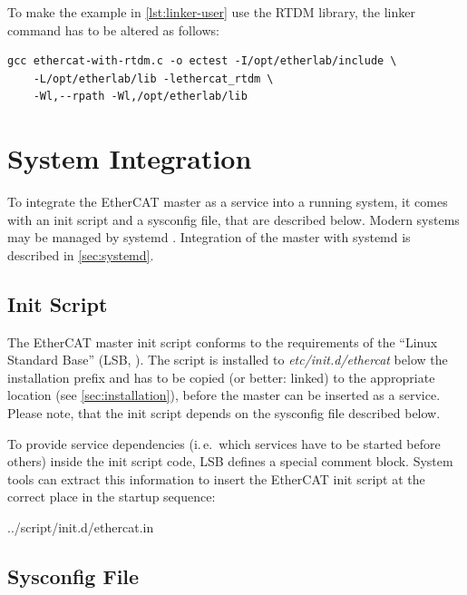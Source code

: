 \documentclass[a4paper,12pt,BCOR=6mm,bibtotoc,idxtotoc]{scrbook}
\begin{document}
To make the example in \autoref{lst:linker-user} use the RTDM library, the
linker command has to be altered as follows:

\begin{lstlisting}
gcc ethercat-with-rtdm.c -o ectest -I/opt/etherlab/include \
    -L/opt/etherlab/lib -lethercat_rtdm \
    -Wl,--rpath -Wl,/opt/etherlab/lib
\end{lstlisting}


\section{System Integration}
\label{sec:system}

To integrate the EtherCAT master as a service into a running system, it comes
with an init script and a sysconfig file, that are described below. Modern
systems may be managed by systemd \cite{systemd}. Integration of the master
with systemd is described in \autoref{sec:systemd}.

\subsection{Init Script}
\label{sec:init}

The EtherCAT master init script conforms to the requirements of the ``Linux
Standard Base'' (LSB, \cite{lsb}). The script is installed to
\textit{etc/init.d/ethercat} below the installation prefix and has to be
copied (or better: linked) to the appropriate location (see
\autoref{sec:installation}), before the master can be inserted as a service.
Please note, that the init script depends on the sysconfig file described
below.

To provide service dependencies (i.\,e.\ which services have to be started
before others) inside the init script code, LSB defines a special comment
block. System tools can extract this information to insert the EtherCAT init
script at the correct place in the startup sequence:


    {../script/init.d/ethercat.in}

\subsection{Sysconfig File}
\label{sec:sysconfig}
\end{document}
